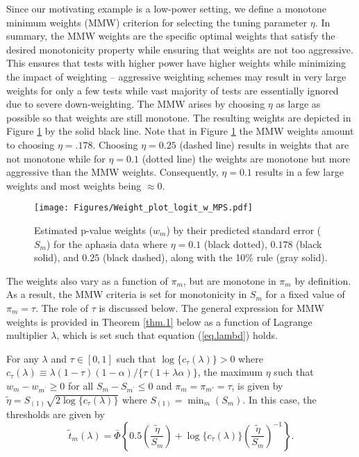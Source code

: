 \documentclass[bimj,fleqn]{w-art}
\theoremstyle{plain}
\theoremstyle{definition}
\begin{document}
Since our motivating example is a low-power setting, we define a monotone minimum weights (MMW) criterion for selecting the tuning parameter $\eta$.  In summary, the MMW weights are the specific optimal weights that satisfy the desired monotonicity property while ensuring that weights are not too aggressive. This ensures that tests with higher power have higher weights while minimizing the impact of weighting -- aggressive weighting schemes may result in very large weights for only a few tests while vast majority of tests are essentially ignored due to severe down-weighting.  The MMW arises by choosing $\eta$ as large as possible so that weights are still monotone. The resulting weights are depicted in Figure \ref{Fig.eta.pl} by the solid black line. Note that in Figure \ref{Fig.eta.pl} the MMW weights amount to choosing $\eta = .178$. Choosing $\eta = 0.25$ (dashed line) results in weights that are not monotone while for $\eta = 0.1$ (dotted line) the weights are monotone but more aggressive than the MMW weights. Consequently, $\eta = 0.1$ results in a few large weights and most weights being $\approx 0$. 



\begin{figure}[t]
\centering
\texttt{[image: Figures/Weight\_plot\_logit\_w\_MPS.pdf]}
\caption{\label{Fig.eta.pl} Estimated p-value weights ($w_m$) by their predicted standard error ($S_m$) for the aphasia data where $\eta = 0.1$ (black dotted), $0.178$ (black solid), and $0.25$ (black dashed), along with the 10\% rule (gray solid).}
\end{figure} 

The weights also vary as a function of $\pi_m$, but are monotone in $\pi_m$ by definition. As a result, the MMW criteria is set for monotonicity in $S_m$ for a fixed value of $\pi_m = \tau$. The role of $\tau$ is discussed below. The general expression for MMW weights is provided in Theorem \ref{thm.1} below as a function of Lagrange multiplier $\lambda$, which is set such that equation (\ref{eq.lambd}) holds. 



\begin{theorem}\label{thm.1}
For any $\lambda$ and $\tau\in [0,1]$ such that $\log\{c_\tau(\lambda)\}>0$ where $c_\tau(\lambda) \equiv  \lambda(1-\tau)(1-\alpha)/\{\tau(1+\lambda \alpha)\}$, the maximum $\eta$ such that $w_{m} - w_{m^\prime}\geq 0$ for all $S_{m} - S_{m^\prime}\leq 0$ and $\pi_m=\pi_{m'} = \tau$, is given by $\tilde{\eta} = S_{(1)}\sqrt{2\log\{c_\tau(\lambda)\}}$ where $S_{(1)} = \min_m(S_m)$. In this case, the thresholds are given by
%
\begin{equation} \label{eq.t_eta}
 \tilde t_{m}(\lambda) = \bar\Phi\left\{0.5\left(\frac{\tilde{\eta}}{S_{m}}\right) + \log\{c_\tau(\lambda)\}\left(\frac{\tilde{\eta}}{S_{m}}\right)^{-1}\right\}.
\end{equation}
%
\end{theorem}
\end{document}
